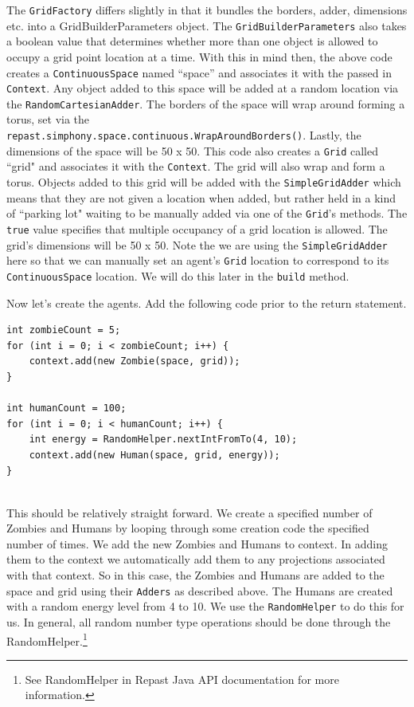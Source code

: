 \documentclass[11pt]{amsart}
\begin{document}
\vspace{.2in}
The \texttt{GridFactory} differs slightly in that it bundles the borders, adder, dimensions etc. into a GridBuilderParameters object. The \texttt{GridBuilderParameters} also takes a boolean value that determines whether more than one object is allowed to occupy a grid point location at a time. With this in mind then, the above code creates a \texttt{ContinuousSpace} named ``space'' and associates it with the passed in \texttt{Context}. Any object added to this space will be added at a random location via the \texttt{RandomCartesianAdder}. The borders of the space will wrap around forming a torus, set via the \\\texttt{repast.simphony.space.continuous.WrapAroundBorders()}. Lastly, the dimensions of the space will be 50 x 50. This code also creates a \texttt{Grid} called ``grid" and associates it with the \texttt{Context}. The grid will also wrap and form a torus. Objects added to this grid will be added with the \texttt{SimpleGridAdder} which means that they are not given a location when added, but rather held in a kind of ``parking lot" waiting to be manually added via one of the \texttt{Grid}'s methods. The \texttt{true} value specifies that multiple occupancy of a grid location is allowed. The grid's dimensions will be 50 x 50. Note the we are using the  \texttt{SimpleGridAdder} here so that we can manually set an agent's \texttt{Grid} location to correspond to its \texttt{ContinuousSpace} location. We will do this later in the \texttt{build} method.

Now let's create the agents. Add the following code prior to the return statement.

\noindent\begin{minipage}[h]{\textwidth}
\vspace{.2in}
\lstset{language=java,caption=JZombiesBuilder.build 2}
\begin{lstlisting}
int zombieCount = 5;
for (int i = 0; i < zombieCount; i++) {
	context.add(new Zombie(space, grid));
}

int humanCount = 100;
for (int i = 0; i < humanCount; i++) {
	int energy = RandomHelper.nextIntFromTo(4, 10);
	context.add(new Human(space, grid, energy));
}


\end{lstlisting}
\vspace{.2in}
\end{minipage}

This should be relatively straight forward. We create a specified number of Zombies and Humans by looping through some creation code the specified number of times. We add the new Zombies and Humans to context. In adding them to the context we automatically add them to any projections associated with that context. So in this case, the Zombies and Humans are added to the space and grid using their \texttt{Adders} as described above. The Humans are created with a random energy level from 4 to 10. We use the \texttt{RandomHelper} to do this for us. In general, all random number type operations should be done through the RandomHelper.\footnote{See  RandomHelper in Repast Java API documentation for more information.}
\end{document}

